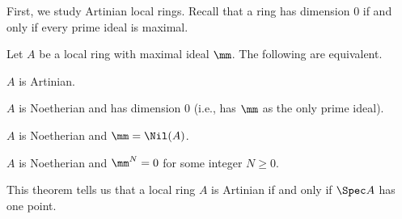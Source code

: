 First, we study Artinian local rings.
Recall that a ring has dimension $0$ if and only if
every prime ideal is maximal.
\begin{theorem}
\label{thm:artinian_local_ring}
Let $A$ be a local ring with maximal ideal $\mm$. 
The following are equivalent.
\begin{alphenum}
    \item $A$ is Artinian.
    \item $A$ is Noetherian and has dimension $0$
    (i.e., has $\mm$ as the only prime ideal).
    \item $A$ is Noetherian and $\mm = \Nil(A)$.
    \item $A$ is Noetherian and 
    $\mm^N=0$ for some integer $N\geq 0$.
\end{alphenum}
\end{theorem}
This theorem tells us that a local ring $A$ is Artinian 
if and only if $\Spec A$ has one point.
